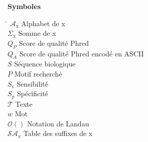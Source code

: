 \begin{paracol}{2}
\begin{tabbing}
\end{tabbing}
    \hspace{5mm}
    \switchcolumn %
\begin{center}
    \textbf{Symboles}
\end{center}
\begin{tabbing}
    \hspace{1.5cm}  \= \kill
    $\mathcal{A}_{\text{x}}$ \> Alphabet de x \\
    $\Sigma_{\text{x}}$ \> Somme de x \\
    $Q_{P}$ \> Score de qualité Phred\\
    $Q_{A}$ \> Score de qualité Phred encodé en ASCII\\
    $S$ \> Séquence biologique\\
    $P$ \> Motif recherché \\
    $S_e$ \> Sensibilité \\
    $S_p$ \> Spécificité\\
    $\mathcal{T}$ \> Texte \\
    $w$ \> Mot\\
    $\mathcal{O}()$ \> Notation de Landau\\
    $\mathcal{SA}_{x}$ \> Table des suffixes de x\\
\end{tabbing}

\end{paracol}





\renewcommand{\lstlistlistingname}{Liste des codes}
\newpage


\tableofcontents
\vspace{10mm}
\newpage

